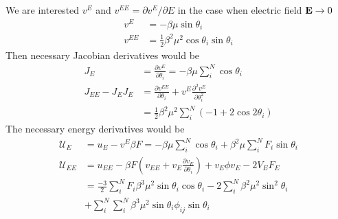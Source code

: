 \documentclass[11pt,reqno]{amsart}
\begin{document}
We are interested $v^E$ and $v^{EE}=\partial v^E/\partial E$ in the case when electric field ${\bf E}\to 0$
\begin{align}
v^E&=-\beta  \mu  \sin \theta _i \nonumber \\
v^{EE}&=\frac{1}{2} \beta ^2 \mu ^2 \cos\theta _i \sin\theta _i 
\end{align}
Then necessary Jacobian derivatives would be
\begin{align}
\label{eq_J}
J_E&=\frac{\partial v^E}{\partial\theta_i} =-\beta  \mu \sum_i^N{\cos\theta _i}  \nonumber \\
J_{EE}-J_E J_E &=\frac{\partial v^{EE}}{\partial\theta_i} + v^E\frac{\partial^2 v^E}{\partial \theta_i^2}\nonumber \\
&= \frac{1}{2} \beta ^2 \mu ^2 \sum_i^N{\left(-1 + 2 \cos2\theta_i\right)}
\end{align}
The necessary energy derivatives would be
\begin{align}
\label{eq_u}
\mathcal{U}_E&= \mathit{u}_E-v^E\beta F = -\beta  \mu  \sum_i^N\cos\theta_i + \beta ^2  \mu\sum_i^N F_i  \sin\theta_i \nonumber \\
\mathcal{U}_{EE}&=\mathit{u}_{EE}-\beta  F \left(v_{EE}+v_E \frac{\partial v_E}{\partial \theta _i}\right)+v_E \phi v_E-2V_E F_E  \nonumber \\
&=\frac{-3}{2} \sum_i^N  F_i \beta ^3  \mu ^2 \sin\theta_i \cos\theta_i-2 \sum_i^N \beta ^2 \mu ^2 \sin ^2\theta_i \nonumber \\
&+\sum_i^N \sum_i^N \beta  ^3 \mu ^2  \sin\theta_i \phi_{ij} \sin\theta_i
\end{align}
\end{document}

